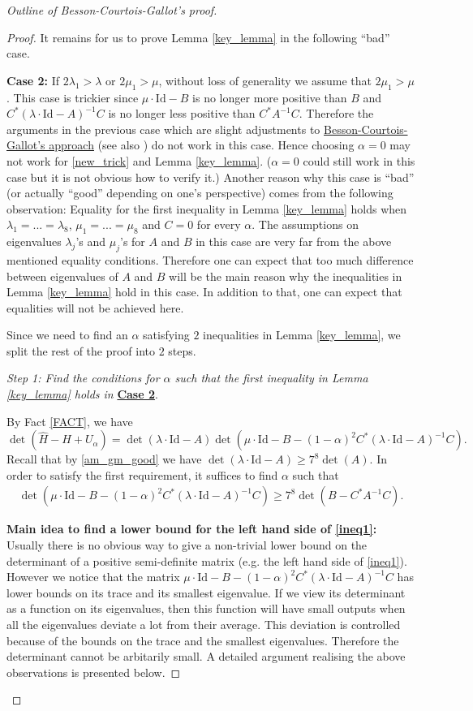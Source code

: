 \documentclass{article}
\newcommand{\id}{\mathrm{Id}}
\theoremstyle{definition}
\begin{document}
\begin{proof}[Outline of Besson-Courtois-Gallot's proof]
\begin{proof}
It remains for us to prove Lemma \ref{key_lemma} in the following ``bad'' case.

\textbf{\hypertarget{case2}{Case 2}:} If $2\lambda_1>\lambda$ or $2\mu_1>\mu$, without loss of generality we assume that $2\mu_1>\mu$. This case is trickier since $\mu\cdot\id-B$ is no longer more positive than $B$ and $C^*(\lambda\cdot\id-A)^{-1}C$ is no longer less positive than $C^*A^{-1}C$. Therefore the arguments in the previous case which are slight adjustments to \hyperlink{BCG's proof sketch}{Besson-Courtois-Gallot's approach} (see also \cite[B.3-B.4 Lemmes]{BCG1}) do not work in this case. Hence choosing $\alpha=0$ may not work for \eqref{new_trick} and Lemma \ref{key_lemma}. ($\alpha=0$ could still work in this case but it is not obvious how to verify it.)  Another reason why this case is ``bad'' (or actually ``good'' depending on one's perspective) comes from the following observation: Equality for the first inequality in Lemma \ref{key_lemma} holds when $\lambda_1=...=\lambda_8$, $\mu_1=...=\mu_8$ and $C=0$ for every $\alpha$. The assumptions on eigenvalues $\lambda_j$'s and $\mu_j$'s for $A$ and $B$ in this case are very far from the above mentioned equality conditions. Therefore one can expect that too much difference between eigenvalues of $A$ and $B$ will be the main reason why the inequalities in Lemma \ref{key_lemma} hold in this case. In addition to that, one can expect that equalities will not be achieved here.

Since we need to find an $\alpha$ satisfying $2$ inequalities in Lemma \ref{key_lemma}, we split the rest of the proof into $2$ steps.

\textit{Step 1: Find the conditions for $\alpha$ such that the first inequality in Lemma \ref{key_lemma} holds in} \textbf{\hyperlink{case2}{Case 2}}.

By Fact \ref{FACT}, we have
$$\det(\widehat H-H+U_\alpha)=\det(\lambda\cdot\id-A)\det(\mu\cdot\id-B-(1-\alpha)^2C^*(\lambda\cdot\id-A)^{-1}C).$$
Recall that by \eqref{am_gm_good} we have $\det(\lambda\cdot\id-A)\geq7^8\det(A).$ In order to satisfy the first requirement, it suffices to find $\alpha$ such that
\begin{align}
\label{ineq1}\det(\mu\cdot\id-B-(1-\alpha)^2C^*(\lambda\cdot\id-A)^{-1}C)\geq 7^8\det(B-C^*A^{-1}C).
\end{align}
 
\textbf{Main idea to find a lower bound for the left hand side of \eqref{ineq1}:} Usually there is no obvious way to give a non-trivial lower bound on the determinant of a positive semi-definite matrix (e.g. the left hand side of \eqref{ineq1}). However we notice that the matrix $\mu\cdot\id-B-(1-\alpha)^2C^*(\lambda\cdot\id-A)^{-1}C$ has lower bounds on its trace and its smallest eigenvalue. If we view its determinant as a function on its eigenvalues, then this function will have small outputs when all the eigenvalues deviate a lot from their average. This deviation is controlled because of the bounds on the trace and the smallest eigenvalues. Therefore the determinant cannot be arbitarily small. A detailed argument realising the above observations is presented below.
 

\end{proof}
\end{proof}
\end{document}
